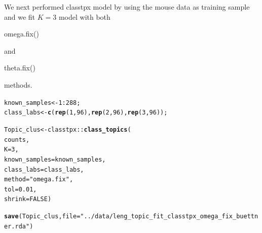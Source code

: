 \documentclass[12pt]{article}\usepackage[]{graphicx}\usepackage[usenames,dvipsnames]{color}
\makeatletter
\newcommand{\hlnum}[1]{\textcolor[rgb]{0.686,0.059,0.569}{#1}}%
\newcommand{\hlstr}[1]{\textcolor[rgb]{0.192,0.494,0.8}{#1}}%
\newcommand{\hlopt}[1]{\textcolor[rgb]{0,0,0}{#1}}%
\newcommand{\hlstd}[1]{\textcolor[rgb]{0.345,0.345,0.345}{#1}}%
\newcommand{\hlkwb}[1]{\textcolor[rgb]{0.69,0.353,0.396}{#1}}%
\newcommand{\hlkwc}[1]{\textcolor[rgb]{0.333,0.667,0.333}{#1}}%
\newcommand{\hlkwd}[1]{\textcolor[rgb]{0.737,0.353,0.396}{\textbf{#1}}}%
\newenvironment{kframe}{%
 \def\at@end@of@kframe{}%
 \ifinner\ifhmode%
  \def\at@end@of@kframe{\end{minipage}}%
  \begin{minipage}{\columnwidth}%
 \fi\fi%
 \def\FrameCommand##1{\hskip\@totalleftmargin \hskip-\fboxsep
 \colorbox{shadecolor}{##1}\hskip-\fboxsep
     \hskip-\linewidth \hskip-\@totalleftmargin \hskip\columnwidth}%
 \MakeFramed {\advance\hsize-\width
   \@totalleftmargin\z@ \linewidth\hsize
   \@setminipage}}%
 {\par\unskip\endMakeFramed%
 \at@end@of@kframe}
\newenvironment{knitrout}{}{} %
\makeatother
\begin{document}
We next performed classtpx model by using the mouse data as training sample and we fit $K=3$ model with both \begin{verb} omega.fix() \end{verb} and \begin{verb} theta.fix() \end{verb} methods.

\begin{knitrout}
\color{fgcolor}\begin{kframe}
\begin{alltt}
\hlstd{known_samples} \hlkwb{<-} \hlnum{1}\hlopt{:}\hlnum{288}\hlstd{;}
\hlstd{class_labs} \hlkwb{<-} \hlkwd{c}\hlstd{(}\hlkwd{rep}\hlstd{(}\hlnum{1}\hlstd{,}\hlnum{96}\hlstd{),} \hlkwd{rep}\hlstd{(}\hlnum{2}\hlstd{,}\hlnum{96}\hlstd{),} \hlkwd{rep}\hlstd{(}\hlnum{3}\hlstd{,}\hlnum{96}\hlstd{));}
\end{alltt}
\end{kframe}
\end{knitrout}

\begin{knitrout}
\color{fgcolor}\begin{kframe}
\begin{alltt}
\hlstd{Topic_clus} \hlkwb{<-} \hlstd{classtpx}\hlopt{::}\hlkwd{class_topics}\hlstd{(}
    \hlstd{counts,}
    \hlkwc{K}\hlstd{=}\hlnum{3}\hlstd{,}
    \hlkwc{known_samples} \hlstd{= known_samples,}
    \hlkwc{class_labs} \hlstd{= class_labs,}
    \hlkwc{method}\hlstd{=}\hlstr{"omega.fix"}\hlstd{,}
    \hlkwc{tol}\hlstd{=}\hlnum{0.01}\hlstd{,}
    \hlkwc{shrink}\hlstd{=}\hlnum{FALSE}\hlstd{)}

\hlkwd{save}\hlstd{(Topic_clus,} \hlkwc{file}\hlstd{=}\hlstr{"../data/leng_topic_fit_classtpx_omega_fix_buettner.rda"}\hlstd{)}
\end{alltt}
\end{kframe}
\end{knitrout}
\end{document}
